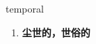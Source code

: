 
\begin{frame}
{\huge temporal}
\begin{center}
\begin{enumerate}\Large
  \item \textbf{尘世的，世俗的}
\end{enumerate}
\end{center}
\end{frame}
